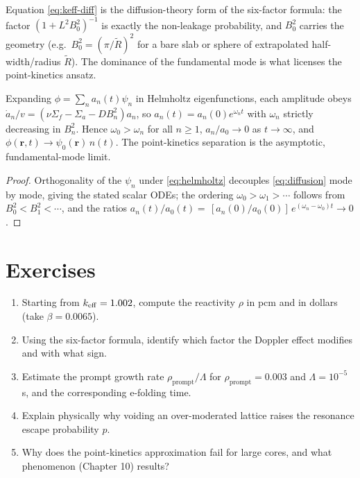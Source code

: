 Equation \eqref{eq:keff-diff} is the diffusion-theory form of the six-factor
formula: the factor $(1+L^2B_0^2)^{-1}$ is exactly the non-leakage probability,
and $B_0^2$ carries the geometry (e.g.\ $B_0^2=(\pi/\tilde R)^2$ for a bare slab or
sphere of extrapolated half-width/radius $\tilde R$). The dominance of the
fundamental mode is what licenses the point-kinetics ansatz.

\begin{proposition}
\label{prop:fundamental}
Expanding $\phi=\sum_n a_n(t)\psi_n$ in Helmholtz eigenfunctions, each amplitude
obeys $\dot a_n/v=(\nu\Sigma_f-\Sigma_a-DB_n^2)a_n$, so
$a_n(t)=a_n(0)e^{\omega_n t}$ with $\omega_n$ strictly decreasing in $B_n^2$.
Hence $\omega_0>\omega_n$ for all $n\ge1$, $a_n/a_0\to0$ as $t\to\infty$, and
$\phi(\mathbf r,t)\to\psi_0(\mathbf r)\,n(t)$. The point-kinetics separation is the
asymptotic, fundamental-mode limit.
\end{proposition}
\begin{proof}
Orthogonality of the $\psi_n$ under \eqref{eq:helmholtz} decouples
\eqref{eq:diffusion} mode by mode, giving the stated scalar ODEs; the ordering
$\omega_0>\omega_1>\cdots$ follows from $B_0^2<B_1^2<\cdots$, and the ratios
$a_n(t)/a_0(t)=\,[a_n(0)/a_0(0)]\,e^{(\omega_n-\omega_0)t}\to0$.
\end{proof}


\section*{Exercises}
\begin{enumerate}[leftmargin=*,itemsep=2pt]
\item Starting from $k_{\mathrm{eff}}=1.002$, compute the reactivity $\rho$ in pcm and in dollars (take $\beta=0.0065$).
\item Using the six-factor formula, identify which factor the Doppler effect modifies and with what sign.
\item Estimate the prompt growth rate $\rho_{\text{prompt}}/\Lambda$ for $\rho_{\text{prompt}}=0.003$ and $\Lambda=10^{-5}\,$s, and the corresponding e-folding time.
\item Explain physically why voiding an over-moderated lattice raises the resonance escape probability $p$.
\item Why does the point-kinetics approximation fail for large cores, and what phenomenon (Chapter 10) results?
\end{enumerate}
